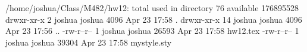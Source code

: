   /home/joshua/Class/M482/hw12:
  total used in directory 76 available 176895528
  drwxr-xr-x  2 joshua joshua  4096 Apr 23 17:58 .
  drwxr-xr-x 14 joshua joshua  4096 Apr 23 17:56 ..
  -rw-r--r--  1 joshua joshua 26593 Apr 23 17:58 hw12.tex
  -rw-r--r--  1 joshua joshua 39304 Apr 23 17:58 mystyle.sty
